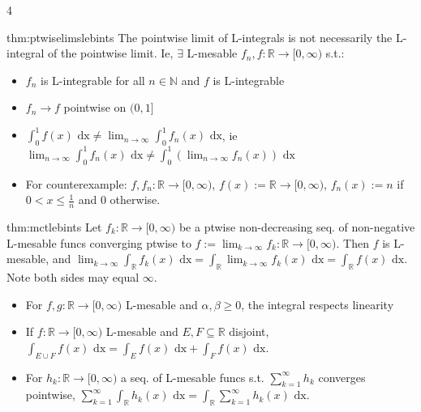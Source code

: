 \documentclass[landscape, 8pt]{extarticle}
\begin{document}
\begin{multicols*}{4}
		
		\begin{thm}{thm:ptwiselimslebints}{ }
			The pointwise limit of L-integrals is not necessarily the L-integral of the pointwise limit. Ie, $\exists$ L-mesable $f_n, f: \mathbb{R} \to [0, \infty)$ s.t.:
			\begin{itemize}
				\item $f_n$ is L-integrable for all $n\in \mathbb{N}$ and $f$ is L-integrable
				\item $f_n \to f$ pointwise on $(0, 1]$
				\item $\int_{0}^{1}f(x) \text{ dx} \ne \lim_{n\to \infty} \int_{0}^{1}f_n(x) \text{ dx}$, ie $\lim_{n\to \infty}\int_{0}^{1}f_n(x) \text{ dx} \ne \int_{0}^{1}\left(\lim_{n\to \infty}f_n(x) \right) \text{ dx}$
				\item For counterexample: $f, f_n: \mathbb{R}\to [0, \infty)$, $f(x) := \mathbb{R} \to [0, \infty)$, $f_n(x) := n$ if $0 < x \le \frac{1}{n}$ and $0$ otherwise.
			\end{itemize}
			
		\end{thm}
		
		
		\begin{mthm}{thm:mctlebints}{ }
			Let $f_k : \mathbb{R} \to [0, \infty)$ be a ptwise non-decreasing seq. of non-negative L-mesable funcs converging ptwise to $f:=\lim_{k\to \infty} f_k : \mathbb{R} \to [0, \infty)$. Then $f$ is L-mesable, and $\lim_{k\to \infty}\int_{\mathbb{R}}f_k(x) \text{ dx} = \int_{\mathbb{R}}\lim_{k\to \infty}f_k(x) \text{ dx} = \int_{\mathbb{R}}f(x) \text{ dx}$. Note both sides may equal $\infty$.
			
			\begin{itemize}
				\item For $f, g: \mathbb{R} \to [0, \infty)$ L-mesable and $\alpha, \beta \ge 0$, the integral respects linearity
				\item If $f:\mathbb{R} \to [0, \infty)$ L-mesable and $E, F \subseteq \mathbb{R}$ disjoint, $\int_{E \cup F} f(x) \text{ dx} = \int_E f(x) \text{ dx} + \int_F f(x) \text{ dx}$.
				\item For $h_k : \mathbb{R} \to [0, \infty)$ a seq. of L-mesable funcs s.t. $\sum_{k=1}^{\infty} h_k$ converges pointwise, $\sum_{k=1}^{\infty} \int_{\mathbb{R}}h_k(x) \text{ dx} = \int_{\mathbb{R}} \sum_{k=1}^{\infty} h_k(x) \text{ dx}$.
			\end{itemize}
			
		\end{mthm}
		

\end{multicols*}
\end{document}
